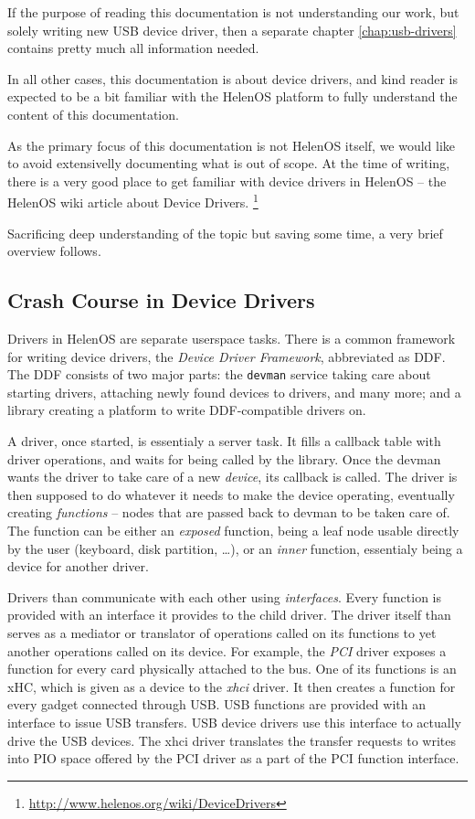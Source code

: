 If the purpose of reading this documentation is not understanding our work, but
solely writing new USB device driver, then a separate chapter \ref{chap:usb-drivers}
contains pretty much all information needed.

In all other cases, this documentation is about device drivers, and kind reader
is expected to be a bit familiar with the HelenOS platform to fully understand
the content of this documentation.

As the primary focus of this documentation is not HelenOS itself, we would like
to avoid extensivelly documenting what is out of scope. At the time of writing,
there is a very good place to get familiar with device drivers in HelenOS --
the HelenOS wiki article about Device Drivers.%
\footnote{\url{http://www.helenos.org/wiki/DeviceDrivers}}

Sacrificing deep understanding of the topic but saving some time, a very brief
overview follows.

\subsection{Crash Course in Device Drivers}

Drivers in HelenOS are separate userspace tasks. There is a common framework
for writing device drivers, the \emph{Device Driver Framework}, abbreviated as
DDF. The DDF consists of two major parts: the \texttt{devman} service taking
care about starting drivers, attaching newly found devices to drivers, and many
more; and a  library creating a platform to write DDF-compatible
drivers on.

A driver, once started, is essentialy a server task. It fills a callback table
with driver operations, and waits for being called by the library. Once the
devman wants the driver to take care of a new \emph{device}, its
 callback is called. The driver is then supposed to do whatever
it needs to make the device operating, eventually creating \emph{functions} --
nodes that are passed back to devman to be taken care of. The function can be
either an \emph{exposed} function, being a leaf node usable directly by the user
(keyboard, disk partition, \dots), or an \emph{inner} function, essentialy
being a device for another driver.

Drivers than communicate with each other using \emph{interfaces}. Every
function is provided with an interface it provides to the child driver. The
driver itself than serves as a mediator or translator of operations called on
its functions to yet another operations called on its device. For example, the
\emph{PCI} driver exposes a function for every card physically attached to the
bus. One of its functions is an xHC, which is given as a device to the
\emph{xhci} driver. It then creates a function for every gadget connected
through USB. USB functions are provided with an interface to issue USB
transfers. USB device drivers use this interface to actually drive the USB
devices. The xhci driver translates the transfer requests to writes into PIO
space offered by the PCI driver as a part of the PCI function interface.

